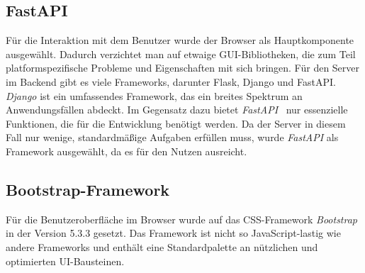 \subsection{FastAPI}

Für die Interaktion mit dem Benutzer wurde der Browser als Hauptkomponente ausgewählt. Dadurch verzichtet man auf etwaige GUI-Bibliotheken, die zum Teil
platformspezifische Probleme und Eigenschaften mit sich bringen. Für den Server im Backend gibt es viele Frameworks, darunter Flask, Django und FastAPI.
\textit{Django} ist ein umfassendes Framework, das ein breites Spektrum an Anwendungsfällen abdeckt. Im Gegensatz dazu bietet \textit{FastAPI}~\cite{fastapi}
nur essenzielle Funktionen, die für die Entwicklung benötigt werden. Da der Server in diesem Fall nur wenige, standardmäßige Aufgaben erfüllen muss, wurde
\textit{FastAPI} als Framework ausgewählt, da es für den Nutzen ausreicht.

\subsection{Bootstrap-Framework}

Für die Benutzeroberfläche im Browser wurde auf das CSS-Framework \textit{Bootstrap}~\cite{bootstrap} in der Version 5.3.3 gesetzt. Das Framework ist nicht so JavaScript-lastig
wie andere Frameworks und enthält eine Standardpalette an nützlichen und optimierten UI-Bausteinen. 
